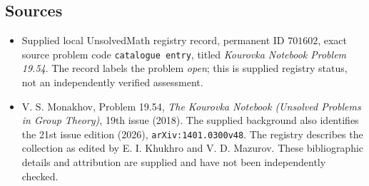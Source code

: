 \documentclass[11pt]{article}
\begin{document}
\subsection{Sources}
\begin{itemize}
\item Supplied local UnsolvedMath registry record, permanent ID \(701602\), exact source problem code \texttt{catalogue entry}, titled \emph{Kourovka Notebook Problem 19.54}. The record labels the problem \emph{open}; this is supplied registry status, not an independently verified assessment.
\item V. S. Monakhov, Problem 19.54, \emph{The Kourovka Notebook (Unsolved Problems in Group Theory)}, 19th issue (2018). The supplied background also identifies the 21st issue edition (2026), \texttt{arXiv:1401.0300v48}. The registry describes the collection as edited by E. I. Khukhro and V. D. Mazurov. These bibliographic details and attribution are supplied and have not been independently checked.
\end{itemize}
\end{document}

